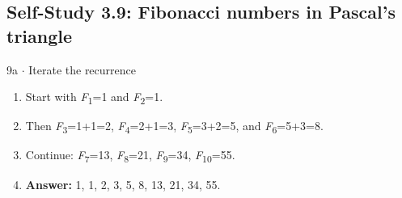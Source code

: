 \documentclass[11pt]{article}
\begin{document}
\begin{keepsection}\subsection{Self-Study 3.9: Fibonacci numbers in Pascal’s triangle}

\begin{workedbox}{9a \ensuremath{\cdot} Iterate the recurrence}
\begin{enumerate}
\item Start with \textit{F}\textsubscript{1}=1 and \textit{F}\textsubscript{2}=1.
\item Then \textit{F}\textsubscript{3}=1+1=2, \textit{F}\textsubscript{4}=2+1=3, \textit{F}\textsubscript{5}=3+2=5, and \textit{F}\textsubscript{6}=5+3=8.
\item Continue: \textit{F}\textsubscript{7}=13, \textit{F}\textsubscript{8}=21, \textit{F}\textsubscript{9}=34, \textit{F}\textsubscript{10}=55.
\item \textbf{Answer:} 1, 1, 2, 3, 5, 8, 13, 21, 34, 55.
\end{enumerate}
\end{workedbox}

\end{keepsection}
\end{document}
